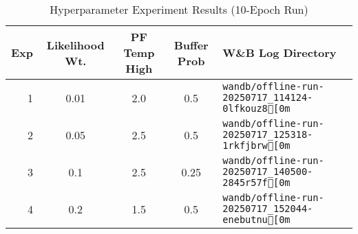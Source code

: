 \begin{table}[h!]
  \centering
  \caption{Hyperparameter Experiment Results (10-Epoch Run)}
  \label{tab:exp_results_10epochs}
  \begin{tabular}{rcccl}
    \toprule
    \textbf{Exp} & \textbf{Likelihood Wt.} & \textbf{PF Temp High} & \textbf{Buffer Prob} & \textbf{W\&B Log Directory} \\
    \midrule
    1 & 0.01 & 2.0 & 0.5 & \texttt{wandb/offline-run-20250717\_114124-0lfkouz8[0m} \\
    2 & 0.05 & 2.5 & 0.5 & \texttt{wandb/offline-run-20250717\_125318-1rkfjbrw[0m} \\
    3 & 0.1 & 2.5 & 0.25 & \texttt{wandb/offline-run-20250717\_140500-2845r57f[0m} \\
    4 & 0.2 & 1.5 & 0.5 & \texttt{wandb/offline-run-20250717\_152044-enebutnu[0m} \\
    \bottomrule
  \end{tabular}
\end{table}

